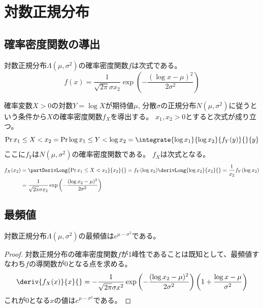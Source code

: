 \chapter{対数正規分布}
    \section{確率密度関数の導出}
        \begin{shadebox}
            対数正規分布$\Lambda(\mu,\sigma^2)$の確率密度関数$f$は次式である。
            \[ f(x) = \frac{1}{\sqrt{2\pi}\sigma x_2}\exp\left(-\frac{(\log x-\mu)^2}{2\sigma^2}\right) \]
        \end{shadebox}
        確率変数$X>0$の対数$Y=\log X$が期待値$\mu$, 分散$\sigma$の正規分布$N(\mu,\sigma^2)$に従うという条件から$X$の確率密度関数$f_X$を導出する。
        $x_1,x_2>0$とすると次式が成り立つ。
        \[ \Pr{x_1\leq X<x_2} = \Pr{\log x_1 \leq Y<\log x_2} = \integrate{\log x_1}{\log x_2}{f_Y(y)}{}{y} \]
        ここに$f_Y$は$N(\mu,\sigma^2)$の確率密度関数である。
        $f_X$は次式となる。
        \begin{align*}
            f_X(x_2) &= \partDerivLong{\Pr{x_1\leq X<x_2}}{x_2}{} = f_Y(\log x_2)\derivLong{\log x_2}{x_2}{} = \frac{1}{x_2}f_Y(\log x_2) \\
            &= \frac{1}{\sqrt{2\pi}\sigma x_2}\exp\left(-\frac{(\log x_2-\mu)^2}{2\sigma^2}\right)
        \end{align*}
    \section{最頻値}
        \begin{shadebox}
            対数正規分布$\Lambda(\mu,\sigma^2)$の最頻値は$e^{\mu-\sigma^2}$である。
        \end{shadebox}
        \begin{proof}
            \quad\par
            対数正規分布の確率密度関数$f$が1峰性であることは既知として、最頻値すなわち$f$の導関数が0となる点を求める。
            \begin{align*}
                \deriv{f_X(x)}{x}{} = -\frac{1}{\sqrt{2\pi}\sigma x^2}\exp\left(-\frac{(\log x_2-\mu)^2}{2\sigma^2}\right)\left(1+\frac{\log x-\mu}{\sigma^2}\right)
            \end{align*}
            これが0となる$x$の値は$e^{\mu-\sigma^2}$である。
        \end{proof}
